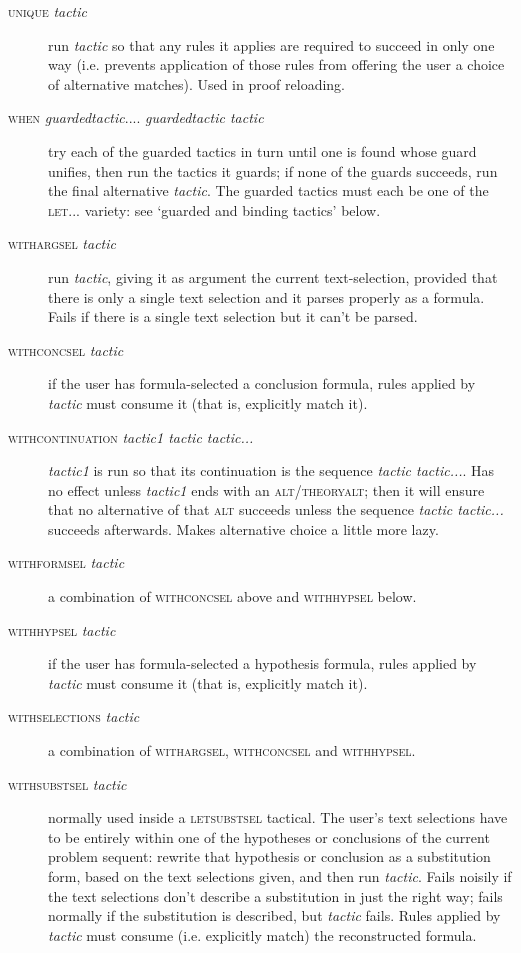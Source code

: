 \begin{description}
\item [\textsc{unique} \textit{tactic}] run \textit{tactic} so that any rules it applies are required to succeed in only one way (i.e. prevents application of those rules from offering the user a choice of alternative matches). Used in proof reloading.


\item [\textsc{when} \textit{guardedtactic}.... \textit{guardedtactic tactic}] try each of the guarded tactics in turn until one is found whose guard unifies, then run the tactics it guards; if none of the guards succeeds, run the final alternative \textit{tactic}. The guarded tactics must each be one of the \textsc{let...} variety: see `guarded and binding tactics' below.


\item [\textsc{withargsel} \textit{tactic}] run \textit{tactic}, giving it as argument the current text-selection, provided that there is only a single text selection and it parses properly as a formula. Fails if there is a single text selection but it can't be parsed.


\item [\textsc{withconcsel} \textit{tactic}] if the user has formula-selected a conclusion formula, rules applied by \textit{tactic} must consume it (that is, explicitly match it).


\item [\textsc{withcontinuation} \textit{tactic1 tactic tactic...}] \textit{tactic1} is run so that its continuation is the sequence \textit{tactic tactic...}. Has no effect unless \textit{tactic1} ends with an \textsc{alt/theoryalt}; then it will ensure that no alternative of that \textsc{alt} succeeds unless the sequence \textit{tactic tactic...} succeeds afterwards. Makes alternative choice a little more lazy.


\item [\textsc{withformsel} \textit{tactic}] a combination of \textsc{withconcsel} above and \textsc{withhypsel} below.


\item [\textsc{withhypsel} \textit{tactic}] if the user has formula-selected a hypothesis formula, rules applied by \textit{tactic} must consume it (that is, explicitly match it).


\item [\textsc{withselections} \textit{tactic}] a combination of \textsc{withargsel}, \textsc{withconcsel} and \textsc{withhypsel}.


\item [\textsc{withsubstsel} \textit{tactic}] normally used inside a \textsc{letsubstsel} tactical. The user's text selections have to be entirely within one of the hypotheses or conclusions of the current problem sequent: rewrite that hypothesis or conclusion as a substitution form, based on the text selections given, and then run \textit{tactic}. Fails noisily if the text selections don't describe a substitution in just the right way; fails normally if the substitution is described, but \textit{tactic} fails. Rules applied by \textit{tactic} must consume (i.e. explicitly match) the reconstructed formula.



\end{description}
